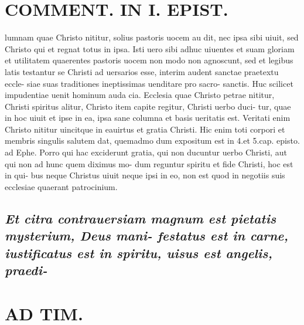 \documentclass{article}
\begin{document}
\begin{pages}
\section*{COMMENT. IN I. EPIST. }\pstart lumnam quae Christo nititur, solius pastoris uocem au dit, nec ipsa sibi uiuit, sed Christo qui et regnat totus in ipsa. Isti uero sibi adhuc uiuentes et suam gloriam et utilitatem quaerentes pastoris uocem non modo non agnoscunt, sed et legibus latis testantur se Christi ad uersarios esse, interim audent sanctae praetextu eccle- siae suas traditiones ineptissimas uenditare pro sacro- sanctis. Huc scilicet impudentiae uenit hominum auda cia. Ecclesia quae Christo petrae nititur, Christi spiritus alitur, Christo item capite regitur, Christi uerbo duci- tur, quae in hoc uiuit et ipse in ea, ipsa sane columna et basis ueritatis est. Veritati enim Christo nititur uincitque in eauirtus et gratia Christi. Hic enim toti corpori et membris singulis salutem dat, quemadmo dum expositum est in 4.et 5.cap. episto. ad Ephe. Porro qui hac exciderunt gratia, qui non ducuntur uerbo Christi, aut qui non ad hunc quem diximus mo- dum reguntur spiritu et fide Christi, hoc est in qui- bus neque Christus uiuit neque ipsi in eo, non est quod in negotiis suis ecclesiae quaerant patrocinium.  \pend
{}
{}
\subsection*{\textit{Et citra contrauersiam magnum est pietatis mysterium, Deus mani- festatus est in carne, iustificatus est in spiritu, uisus est angelis, praedi- }}
\section*{AD TIM. }
\marginpar{[ p.135 ]}
{}

\end{pages}
\end{document}
